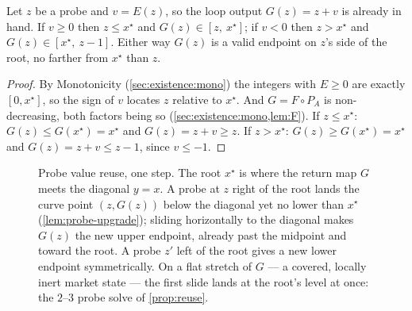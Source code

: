 \begin{lemma}
\label{lem:probe-upgrade}
Let $z$ be a probe and $v = E(z)$, so the loop output $G(z) = z + v$ is
already in hand. If $v \geq 0$ then $z \leq x^\star$ and
$G(z) \in [z,\ x^\star]$; if $v < 0$ then $z > x^\star$ and
$G(z) \in [x^\star,\ z-1]$. Either way $G(z)$ is a valid endpoint on
$z$'s side of the root, no farther from $x^\star$ than $z$.
\end{lemma}

\begin{proof}
By Monotonicity (\cref{sec:existence:mono}) the integers with $E \geq 0$
are exactly $[0, x^\star]$, so the sign of $v$ locates $z$ relative to
$x^\star$. And $G = F \circ P_A$ is non-decreasing, both factors being so
(\cref{sec:existence:mono,lem:F}). If $z \leq x^\star$: $G(z) \leq
G(x^\star) = x^\star$ and $G(z) = z + v \geq z$. If $z > x^\star$:
$G(z) \geq G(x^\star) = x^\star$ and $G(z) = z + v \leq z - 1$, since
$v \leq -1$.
\end{proof}

\begin{figure}[!ht]
\centering
{}
\caption{Probe value reuse, one step. The root $x^\star$ is where the
return map $G$ meets the diagonal $y = x$. A probe at $z$ right of the
root lands the curve point $(z, G(z))$ below the diagonal yet no lower
than $x^\star$ (\cref{lem:probe-upgrade}); sliding horizontally to the
diagonal makes $G(z)$ the new upper endpoint, already past the midpoint
and toward the root. A probe $z'$ left of the root gives a new lower
endpoint symmetrically. On a flat stretch of $G$ --- a covered, locally
inert market state --- the first slide lands at the root's level at once:
the $2$--$3$ probe solve of \cref{prop:reuse}.}
\label{fig:reuse}
\end{figure}

